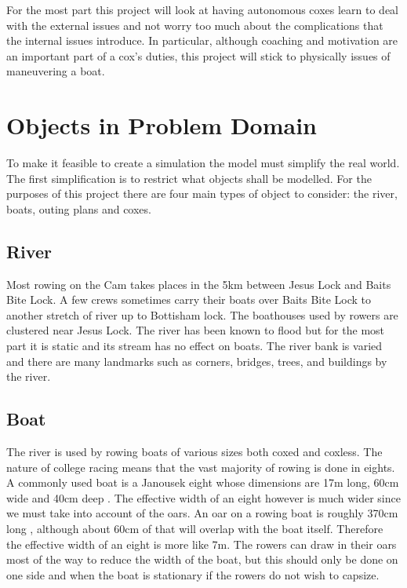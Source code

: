 For the most part this project will look at having autonomous coxes
learn to deal with the external issues and not worry too much about
the complications that the internal issues introduce. In particular,
although coaching and motivation are an important part of a cox's
duties, this project will stick to physically issues of maneuvering a boat.

\section{Objects in Problem Domain}\label{sop:objuni}

To make it feasible to create a simulation the model must simplify the real world. The first simplification is to restrict what objects shall be modelled. For the purposes of this project there are four main types of object to consider: the river, boats, outing plans and coxes. 

\subsection{River} \label{riversubsec}
Most rowing on the Cam takes places in the 5km between Jesus Lock and
Baits Bite Lock. A few crews sometimes carry
their boats over Baits Bite Lock to another stretch of river up to
Bottisham lock. The boathouses used by rowers are clustered near Jesus
Lock. The river has been known to flood but for the most
part it is static and its stream has no effect on boats. The river bank is
varied and there are many landmarks
such as corners, bridges, trees, and buildings by the river.

\subsection{Boat}
The river is used by rowing boats
of various sizes both coxed and coxless. The nature of
college racing means that the vast majority of rowing is done in
eights. A commonly used boat is a Janousek eight whose dimensions are 17m long, 60cm wide and 40cm deep
\cite{Janousek}. The effective width of an eight however is much wider
since we must take into account of the oars. An oar on a rowing boat
is roughly 370cm long \cite{Concept2}, although about 60cm of that
will overlap with the boat itself. Therefore the effective width of an
eight is more like 7m. The rowers can draw in their oars most of the
way to reduce the width of the boat, but this should only be done on
one side and when the boat is stationary if the rowers do not wish to
capsize.

